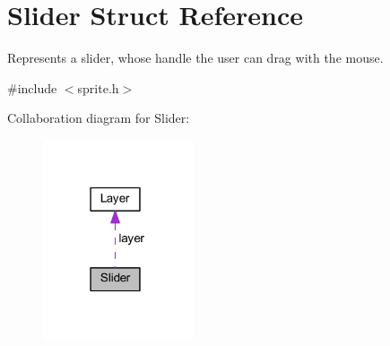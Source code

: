 \hypertarget{struct_slider}{}\section{Slider Struct Reference}
\label{struct_slider}


Represents a slider, whose handle the user can drag with the mouse.  




{\ttfamily \#include $<$sprite.\+h$>$}



Collaboration diagram for Slider\+:\nopagebreak
\begin{figure}[H]
\begin{center}
\leavevmode
\includegraphics[width=126pt]{struct_slider__coll__graph}
\end{center}
\end{figure}

